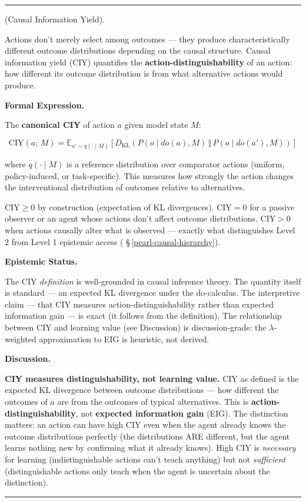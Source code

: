 \documentclass[11pt,oneside]{article}
\newcounter{claim}[section]
\renewcommand{\theclaim}{\thesection.\arabic{claim}}
\newenvironment{segment}[2]{%
  \refstepcounter{claim}%
  \bigskip\noindent\hrule\smallskip
  \noindent{\bfseries #1~\theclaim}\enskip(#2).\par\smallskip
  \noindent\ignorespaces
}{%
  \par\smallskip\noindent\hrule\bigskip
}
\newenvironment{definition}[1][]{\begin{segment}{Definition}{#1}}{\end{segment}}
\begin{document}
\begin{definition}[Causal Information Yield]
\label{causal-information-yield}
Actions don't merely select among outcomes — they produce characteristically different outcome distributions depending on the causal structure. Causal information yield (CIY) quantifies the \textbf{action-distinguishability} of an action: how different its outcome distribution is from what alternative actions would produce.



\medskip\noindent\textbf{Formal Expression.}



The \textbf{canonical CIY} of action $a$ given model state $M$:

$$\text{CIY}(a;\, M) = \mathbb{E}_{a' \sim q(\cdot \mid M)}\!\left[D_{\mathrm{KL}}\!\left(P(o \mid do(a), M) \,\Vert\, P(o \mid do(a'), M)\right)\right]$$

where $q(\cdot \mid M)$ is a reference distribution over comparator actions (uniform, policy-induced, or task-specific). This measures how strongly the action changes the interventional distribution of outcomes relative to alternatives.

$\text{CIY} \geq 0$ by construction (expectation of KL divergences). $\text{CIY} = 0$ for a passive observer or an agent whose actions don't affect outcome distributions. $\text{CIY} > 0$ when actions causally alter what is observed — exactly what distinguishes Level 2 from Level 1 epistemic access ( \S\,\ref{pearl-causal-hierarchy}).


\medskip\noindent\textbf{Epistemic Status.}


The CIY \textit{definition} is well-grounded in causal inference theory. The quantity itself is standard — an expected KL divergence under the do-calculus. The interpretive claim — that CIY measures action-distinguishability rather than expected information gain — is exact (it follows from the definition). The relationship between CIY and learning value (see Discussion) is discussion-grade: the $\lambda$-weighted approximation to EIG is heuristic, not derived.


\medskip\noindent\textbf{Discussion.}


\textbf{CIY measures distinguishability, not learning value.} CIY as defined is the expected KL divergence between outcome distributions — how different the outcomes of $a$ are from the outcomes of typical alternatives. This is \textbf{action-distinguishability}, not \textbf{expected information gain} (EIG). The distinction matters: an action can have high CIY even when the agent already knows the outcome distributions perfectly (the distributions ARE different, but the agent learns nothing new by confirming what it already knows). High CIY is \textit{necessary} for learning (indistinguishable actions can't teach anything) but not \textit{sufficient} (distinguishable actions only teach when the agent is uncertain about the distinction).


\end{definition}
\end{document}
